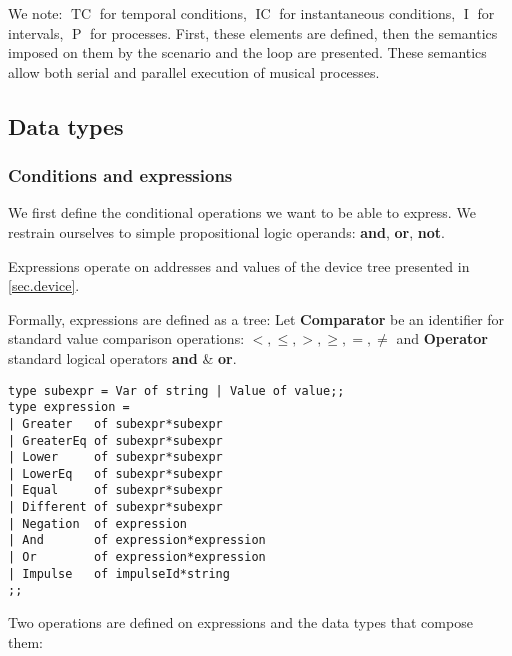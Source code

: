 \documentclass[applsci,article,submit,moreauthors,pdftex,10pt,a4paper]{mdpi}
\DeclareMathOperator{\tc}{TC}
\DeclareMathOperator{\ic}{IC}
\DeclareMathOperator{\itv}{I}
\DeclareMathOperator{\proc}{P}
\begin{document}
We note: $\tc$ for temporal conditions, $\ic$ for instantaneous conditions, $\itv$ for intervals, $\proc$ for processes. 
First, these elements are defined, then the semantics imposed on them by the scenario and the loop are presented.
These semantics allow both serial and parallel execution of musical processes.

\subsection{Data types}
    
    
\subsubsection{Conditions and expressions}
We first define the conditional operations we want to be able to express.
We restrain ourselves to simple propositional logic operands: \textbf{and}, \textbf{or}, \textbf{not}.

Expressions operate on addresses and values of the device tree presented in \ref{sec.device}.

Formally, expressions are defined as a tree:
Let \textbf{Comparator} be an identifier for standard value comparison operations: $<, \leq, >, \geq, =, \neq$ and \textbf{Operator} standard logical operators \textbf{and} \&  \textbf{or}.

\begin{lstlisting}
type subexpr = Var of string | Value of value;;
type expression =
| Greater   of subexpr*subexpr
| GreaterEq of subexpr*subexpr
| Lower     of subexpr*subexpr
| LowerEq   of subexpr*subexpr
| Equal     of subexpr*subexpr
| Different of subexpr*subexpr
| Negation  of expression
| And       of expression*expression
| Or        of expression*expression
| Impulse   of impulseId*string
;;
\end{lstlisting}
Two operations are defined on expressions and the data types that compose them: 
\end{document}
